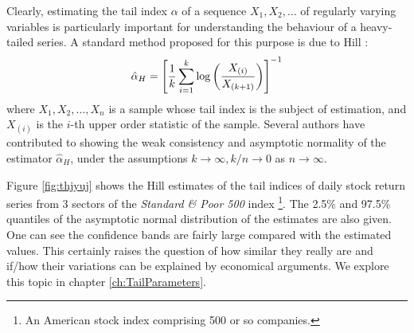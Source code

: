 Clearly, estimating the tail index $\alpha$ of a sequence
$X_1, X_2, \dots$ of regularly varying variables is particularly
important for understanding the behaviour of a heavy-tailed series. A
standard method proposed for this purpose is due to Hill
\cite{hill1975simple}:
\begin{equation}
  \label{eq:fhhty}
  \hat \alpha_H = \left[
    {1 \over k} \sum_{i=1}^k \log \left(
      X_{(i)} \over X_{(k+1)}
    \right)
  \right]^{-1}
\end{equation}
where $X_1, X_2, \dots, X_n$ is a sample whose tail index is the
subject of estimation, and $X_{(i)}$ is the $i$-th upper order
statistic of the sample. Several authors have contributed to showing
the weak consistency and asymptotic normality of the estimator
$\hat \alpha_H$, under the assumptions $k \to \infty, k/n \to 0$
as $n \to \infty$.


Figure \ref{fig:thjyuj} shows the Hill estimates of the tail indices
of daily stock return series from 3 sectors of the
{\em Standard \& Poor 500} index \footnote{An American stock index
  comprising 500 or so companies.}. The 2.5\% and 97.5\% quantiles of
the asymptotic normal distribution of the estimates are also
given. One can see the confidence bands are fairly large compared with
the estimated values. This certainly raises the question of how
similar they really are and if/how their variations can be explained by
economical arguments. We explore this topic in chapter
\ref{ch:TailParameters}.

